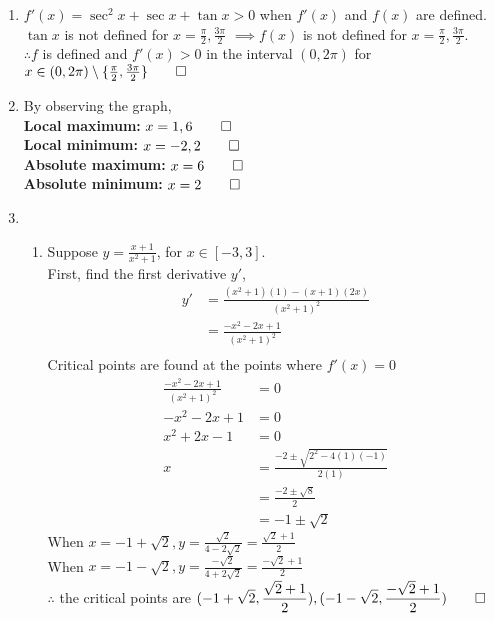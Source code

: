 \documentclass[12pt, a4paper]{article}
\begin{document}
\begin{enumerate}[Q\arabic*.]
  \item $f'(x) = \sec^2x + \sec x + \tan x > 0$ when $f'(x)$ and $f(x)$ are defined.\\
    $\tan x$ is not defined for $x = \frac{\pi}{2}, \frac{3\pi}{2}$ $\implies f(x)$ is not defined for $x = \frac{\pi}{2}, \frac{3\pi}{2}$.\\
    $\therefore f$ is defined and $f'(x) > 0$ in the interval $(0, 2\pi)$ for $x \in (0, 2\pi) \setminus \{\frac{\pi}{2}, \frac{3\pi}{2}\} \qed$
  \item By observing the graph,\\ 
    \textbf{Local maximum: }$x = 1, 6 \qed$\\
    \textbf{Local minimum: }$x = -2, 2 \qed$\\
    \textbf{Absolute maximum: }$x = 6 \qed$\\
    \textbf{Absolute minimum: }$x = 2 \qed$\\
  \item 
    \begin{enumerate}[(\roman*)]
      \item Suppose $\displaystyle y = \frac{x+1}{x^2+1}$, for $x \in [-3, 3]$.\\
        First, find the first derivative $y'$,
        \begin{align*}
          y' &= \frac{(x^2+1)(1) - (x+1)(2x)}{(x^2+1)^2} \\
             &= \frac{-x^2-2x+1}{(x^2+1)^2}\\
        \end{align*}
        Critical points are found at the points where $f'(x) = 0$
        \begin{align*}
          \frac{-x^2-2x+1}{(x^2+1)^2}&= 0\\
          -x^2-2x+1 &= 0\\
          x^2+2x-1 &= 0\\
          x &= \frac{-2\pm\sqrt{2^2-4(1)(-1)}}{2(1)}\\
            &= \frac{-2\pm\sqrt{8}}{2}\\
            &= -1\pm\sqrt{2}
        \end{align*}
        When $x = -1+\sqrt{2}, y = \frac{\sqrt{2}}{4-2\sqrt{2}} = \frac{\sqrt{2}+1}{2}$\\
        When $x = -1-\sqrt{2}, y = \frac{-\sqrt{2}}{4+2\sqrt{2}} = \frac{-\sqrt{2}+1}{2}$\\
        $\therefore$ the critical points are $\displaystyle (-1+\sqrt{2}, \frac{\sqrt{2}+1}{2}), (-1-\sqrt{2}, \frac{-\sqrt{2}+1}{2}) \qed$


\end{enumerate}
\end{enumerate}
\end{document}
